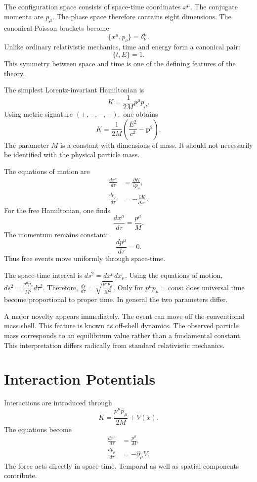 The configuration space consists of space-time coordinates
$x^\mu.$ The conjugate momenta are $ p_\mu. $
The phase space therefore contains eight dimensions.
The canonical Poisson brackets become
\begin{equation}
    \label{shp-pb}
\{x^\mu,p_\nu\} = \delta^\mu_\nu.
\end{equation}
Unlike ordinary relativistic mechanics, time and energy form a canonical pair:
\[ \{t,E\} = 1.\]
This symmetry between space and time is one of the defining features of the theory.

The simplest Lorentz-invariant Hamiltonian is
\begin{equation}
    \label{shp-h0}
K=\frac{1}{2M} p^\mu p_\mu.
\end{equation}
Using metric signature $(+,-,-,-),$
one obtains
\[ K=\frac{1}{2M}\left(\frac{E^2}{c^2}-\mathbf{p}^2\right).\]
The parameter $ M $
is a constant with dimensions of mass.
It should not necessarily be identified with the physical particle mass.

The equations of motion are
\begin{align}
    \label{shp-heq1}
\frac{dx^\mu}{d\tau}&=\frac{\partial K}{\partial p_\mu},\\
\frac{dp_\mu}{d\tau}&=-\frac{\partial K}{\partial x^\mu}.
\end{align}
For the free Hamiltonian,
one finds
    \[\frac{dx^\mu}{d\tau} = \frac{p^\mu}{M}.\]
The momentum remains constant:
    \[\frac{dp^\mu}{d\tau} = 0.\]
Thus free events move uniformly through space-time.

The space-time interval is $ ds^2 = dx^\mu dx_\mu. $
Using the equations of motion, $  ds^2 = \frac{p^\mu p_\mu}{M^2}d\tau^2.$
Therefore, $  \frac{ds}{d\tau} = \sqrt{\frac{p^\mu p_\mu}{M^2}}.$
Only for $ p^\mu p_\mu = \mathrm{const} $
does universal time become proportional to proper time.
In general the two parameters differ.

A major novelty appears immediately.
The event can move off the conventional mass shell.
This feature is known as off-shell dynamics.
The observed particle mass corresponds to an equilibrium value rather 
than a fundamental constant.
This interpretation differs radically from standard relativistic mechanics.

\section{Interaction Potentials}
Interactions are introduced through
\begin{equation}
    \label{shp-h}
K = \frac{p^\mu p_\mu}{2M}+V(x).
\end{equation}
The equations become
\begin{align}
    \label{shp-heq2}
\frac{dx^\mu}{d\tau}&=\frac{p^\mu}{M},\\
\frac{dp_\mu}{d\tau}&=-\partial_\mu V.
\end{align}
The force acts directly in space-time.
Temporal as well as spatial components contribute.


